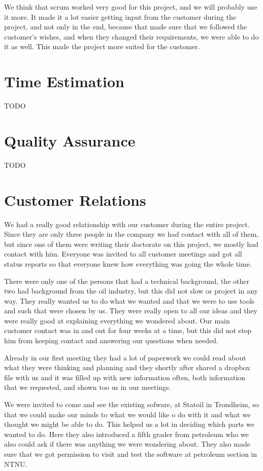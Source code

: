 \documentclass{report}
\begin{document}
We think that scrum worked very good for this project, and we will probably use it more. It made it a lot easier getting input from the customer during the project, and not only in the end, because that made sure that we followed the customer's wishes, and when they changed their requirements, we were able to do it as well. This made the project more suited for the customer. 

\newpage
\section{Time Estimation} \label{sec:time_est}
TODO
\newpage
\section{Quality Assurance} \label{sec:qual_ass}
TODO
\newpage
\section{Customer Relations} \label{sec:customer_relations}
We had a really good relationship with our customer during the entire project. Since they are only three people in the company we had contact with all of them, but since one of them were writing their doctorate on this project, we mostly had contact with him. Everyone was invited to all customer meetings and got all status reports so that everyone knew how everything was going the whole time.

There were only one of the persons that had a technical background, the other two had background from the oil industry, but this did not slow or project in any way. They really wanted us to do what we wanted and that we were to use tools and such that were chosen by us. They were really open to all our ideas and they were really good at explaining everything we wondered about. Our main customer contact was in and out for four weeks at a time, but this did not stop him from keeping contact and answering our questions when needed.

Already in our first meeting they had a lot of paperwork we could read about what they were thinking and planning and they shortly after shared a dropbox file with us and it was filled up with new information often, both information that we requested, and shown too us in our meetings. 

We were invited to come and see the existing sofware, at Statoil in Trondheim, so that we could make our minds to what we would like o do with it and what we thought we might be able to do. This helped us a lot in deciding which parts we wanted to do. Here they also introduced a fifth grader from petroleum who we also could ask if there was anything we were wondering about. They also made sure that we got permission to visit and test the software at petroleum section in NTNU. %
\end{document}
